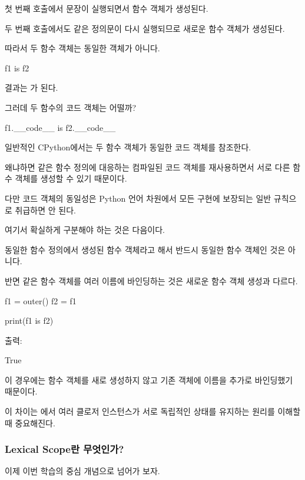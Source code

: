 첫 번째  호출에서  문장이 실행되면서 함수 객체가 생성된다.

두 번째  호출에서도 같은 정의문이 다시 실행되므로 새로운 함수 객체가 생성된다.

따라서 두 함수 객체는 동일한 객체가 아니다.

\begin{dhkcode}
f1 is f2
\end{dhkcode}

결과는 가 된다.

그러데 두 함수의 코드 객체는 어떨까?

\begin{dhkcode}
f1.__code__ is f2.__code__
\end{dhkcode}

일반적인 CPython에서는 두 함수 객체가 동일한 코드 객체를 참조한다.

왜냐하면 같은 함수 정의에 대응하는 컴파일된 코드 객체를 재사용하면서 서로 다른 함수 객체를 생성할 수 있기 때문이다.

다만 코드 객체의  동일성은 Python 언어 차원에서 모든 구현에 보장되는 일반 규칙으로 취급하면 안 된다.

여기서 확실하게 구분해야 하는 것은 다음이다.

동일한 함수 정의에서 생성된 함수 객체라고 해서 반드시 동일한 함수 객체인 것은 아니다.

반면 같은 함수 객체를 여러 이름에 바인딩하는 것은 새로운 함수 객체 생성과 다르다.

\begin{dhkcode}
f1 = outer()
f2 = f1

print(f1 is f2)
\end{dhkcode}

출력:

\begin{dhkzsh}
True
\end{dhkzsh}

이 경우에는 함수 객체를 새로 생성하지 않고 기존 객체에 이름을 추가로 바인딩했기 때문이다.

이 차이는 에서 여러 클로저 인스턴스가 서로 독립적인 상태를 유지하는 원리를 이해할 때 중요해진다.

\subsubsection{Lexical Scope란 무엇인가?}

이제 이번 학습의 중심 개념으로 넘어가 보자.

